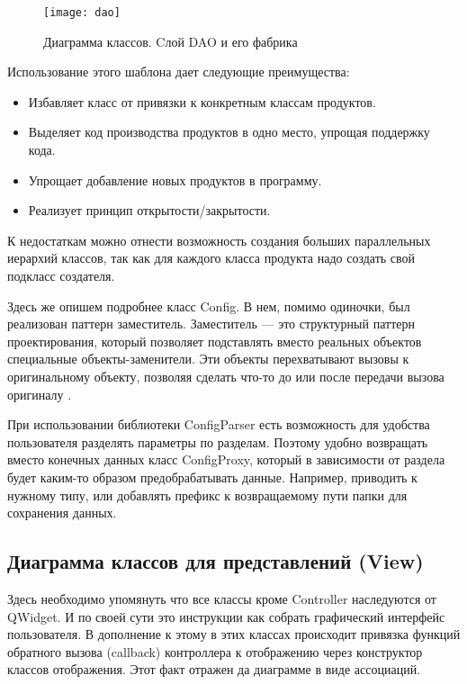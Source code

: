 \documentclass[14pt]{extreport}
\begin{document}
\begin{figure}[H]
	\centerline{\texttt{[image: dao]}}
	\caption{Диаграмма классов. Cлой DAO и его фабрика}
	\label{fig7}
\end{figure}


Использование этого шаблона дает следующие преимущества:
\begin{itemize}
\item Избавляет класс от привязки к конкретным классам продуктов.
\item Выделяет код производства продуктов в одно место, упрощая поддержку кода.
\item Упрощает добавление новых продуктов в программу.
\item Реализует принцип открытости/закрытости.
\end{itemize}

К недостаткам можно отнести возможность создания больших параллельных иерархий классов, так как для каждого класса продукта надо создать свой подкласс создателя.

Здесь же опишем подробнее класс Config. В нем, помимо одиночки, был реализован паттерн заместитель. 
Заместитель — это структурный паттерн проектирования, который позволяет подставлять вместо реальных объектов специальные объекты-заменители. Эти объекты перехватывают вызовы к оригинальному объекту, позволяя сделать что-то до или после передачи вызова оригиналу \cite{pattern-proxy}. 

При использовании библиотеки ConfigParser есть возможность для удобства пользователя разделять параметры по разделам. Поэтому удобно возвращать вместо конечных данных класс ConfigProxy, который в зависимости от раздела будет каким-то образом предобрабатывать данные. Например, приводить к нужному типу, или добавлять префикс к возвращаемому пути папки для сохранения данных. 

\subsection{Диаграмма классов для представлений (View)}

Здесь необходимо упомянуть что все классы кроме Controller наследуются от QWidget. И по своей сути это инструкции как собрать графический интерфейс пользователя. В дополнение к этому в этих классах происходит привязка функций обратного вызова (callback) контроллера к отображению через конструктор классов отображения. Этот факт отражен да диаграмме в виде ассоциаций. 
\end{document}
